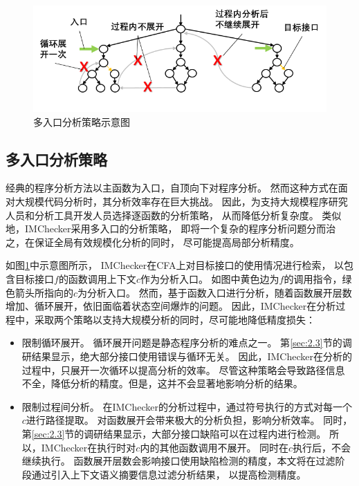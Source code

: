\begin{figure}[b]
	\centering
	\includegraphics[width=0.9\linewidth]{figures/cp3-3-multi-entry.png}
	\caption{
		多入口分析策略示意图
	}
	\label{fig:3-3-multi-entry}
\end{figure}

\subsection{多入口分析策略}
经典的程序分析方法以主函数为入口，自顶向下对程序分析。
然而这种方式在面对大规模代码分析时，其分析效率存在巨大挑战。
因此，为支持大规模程序研究人员和分析工具开发人员选择逐函数的分析策略，
从而降低分析复杂度。
类似地，IMChecker采用多入口的分析策略，
即将一个复杂的程序分析问题分而治之，在保证全局有效规模化分析的同时，
尽可能提高局部分析精度。

如图\ref{fig:3-3-multi-entry}中示意图所示，
IMChecker在CFA上对目标接口的使用情况进行检索，
以包含目标接口$f$的函数调用上下文$c$作为分析入口。
如图中黄色边为$f$的调用指令，绿色箭头所指向的$c$为分析入口。
然而，基于函数入口进行分析，随着函数展开层数增加、循环展开，依旧面临着状态空间爆炸的问题。
因此，IMChecker在分析过程中，采取两个策略以支持大规模分析的同时，尽可能地降低精度损失：
\begin{itemize}
	\item 限制循环展开。
	循环展开问题是静态程序分析的难点之一。
	第\ref{sec:2.3}节的调研结果显示，绝大部分接口使用错误与循环无关。
	因此，IMChecker在分析的过程中，只展开一次循环以提高分析的效率。
	尽管这种策略会导致路径信息不全，降低分析的精度。但是，这并不会显著地影响分析的结果。
	\item 限制过程间分析。
	在IMChecker的分析过程中，通过符号执行的方式对每一个$c$进行路径提取。
	对函数展开会带来极大的分析负担，影响分析效率。
	同时，第\ref{sec:2.3}节的调研结果显示，大部分接口缺陷可以在过程内进行检测。
	所以，IMChecker在执行时对$c$内的其他函数调用不展开。
	同时在$c$执行后，不会继续执行。
	函数展开层数会影响接口使用缺陷检测的精度，本文将在过滤阶段通过引入上下文语义摘要信息过滤分析结果，
	以提高检测精度。
\end{itemize}



